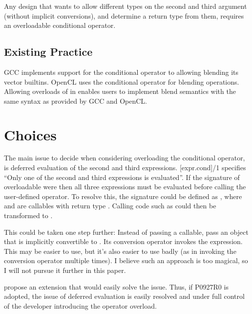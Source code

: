 Any design that wants to allow different types on the second and third argument (without implicit conversions), and determine a return type from them, requires an overloadable conditional operator.

\subsection{Existing Practice}
GCC implements support for the conditional operator to allowing blending its vector builtins.
OpenCL uses the conditional operator for blending operations.
Allowing overloads of  in \CC{} enables users to implement blend semantics with the same syntax as provided by GCC and OpenCL.

\section{Choices}
The main issue to decide when considering overloading the conditional operator, is deferred evaluation of the second and third expressions.
[expr.cond]/1 specifies “Only one of the second and third expressions is evaluated”.
If the signature of overloadable  were  then all three expressions must be evaluated before calling the user-defined operator.
To resolve this, the signature could be defined as , where  and  are callables with return type .
Calling code such as  could then be transformed to .

This could be taken one step further:
Instead of passing a callable, pass an object that is implicitly convertible to .
Its conversion operator invokes the expression.
This may be easier to use, but it's also easier to use badly (as in invoking the conversion operator multiple times).
I believe such an approach is too magical, so I will not pursue it further in this paper.

\textcite{P0927R0} propose an extension that would easily solve the issue.
Thus, if P0927R0 is adopted, the issue of deferred evaluation is easily resolved and under full control of the developer introducing the operator overload.

